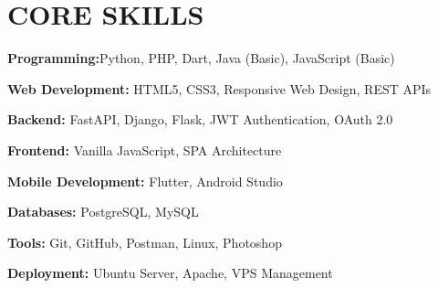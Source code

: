 \documentclass[10pt,a4paper]{article}
\begin{document}












\section*{CORE SKILLS}

\textbf{Programming:}Python, PHP, Dart, Java (Basic), JavaScript (Basic)

\textbf{Web Development:} HTML5, CSS3, Responsive Web Design, REST APIs

\textbf{Backend:} FastAPI, Django, Flask, JWT Authentication, OAuth 2.0

\textbf{Frontend:} Vanilla JavaScript, SPA Architecture

\textbf{Mobile Development:} Flutter, Android Studio

\textbf{Databases:} PostgreSQL, MySQL

\textbf{Tools:} Git, GitHub, Postman, Linux, Photoshop

\textbf{Deployment:} Ubuntu Server, Apache, VPS Management

\end{document}
